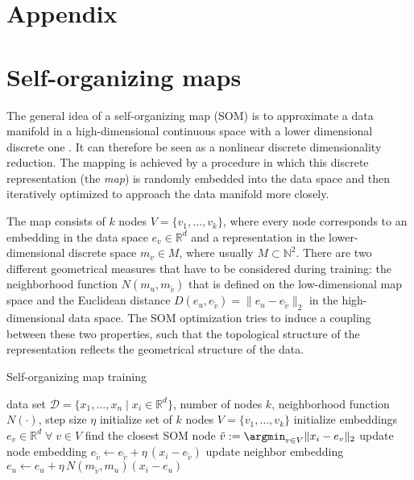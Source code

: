 \beginsupplement

\newpage

\appendix

\section*{Appendix}

\section{Self-organizing maps}\label{sec:SOMs}

The general idea of a self-organizing map (SOM) is to approximate a data manifold in a high-dimensional continuous space with a lower dimensional discrete one \citep{Kohonen1998}.
It can therefore be seen as a nonlinear discrete dimensionality reduction.
The mapping is achieved by a procedure in which this discrete representation (the \emph{map}) is randomly embedded into the data space and then iteratively optimized to approach the data manifold more closely.

The map consists of $k$ nodes $V=\{v_1, \dots , v_k\}$, where every node corresponds to an embedding in the data space $e_v \in \mathbb{R}^d$ and a representation in the lower-dimensional discrete space $m_v \in M$, where usually $M \subset \mathbb{N}^2$.
There are two different geometrical measures that have to be considered during training: the neighborhood function $N(m_u, m_{\tilde{v}})$ that is defined on the low-dimensional map space and the Euclidean distance $D (e_u, e_{\tilde{v}}) = \| e_u - e_{\tilde{v}} \|_2$ in the high-dimensional data space.
The SOM optimization tries to induce a coupling between these two properties, such that the topological structure of the representation reflects the geometrical structure of the data.


\begin{algorithm}
\caption{Self-organizing map training}
\label{alg:som_train}

\begin{algorithmic}
	\Require data set $\mathcal{D} = \{x_1, \dots ,x_n \; \vert \; x_i \in \mathbb{R}^d\}$, number of nodes $k$, neighborhood function $N(\cdot)$, step size $\eta$
	\State initialize set of $k$ nodes $V=\{v_1, \dots , v_k\}$
	\State initialize embeddings $e_v \in \mathbb{R}^d \; \forall \; v \in V$
		\State find the closest SOM node $\tilde{v} := \argmin_{v \in V} \| x_i - e_v \|_2$
		\State update node embedding $e_{\tilde{v}} \gets e_{\tilde{v}} + \eta \, (x_i - e_{\tilde{v}})$
			\State update neighbor embedding $e_u \gets e_u + \eta \, N(m_{\tilde{v}}, m_u) (x_i - e_u)$
		\EndFor
	\EndFor
	\EndWhile
\end{algorithmic}
	
\end{algorithm}

